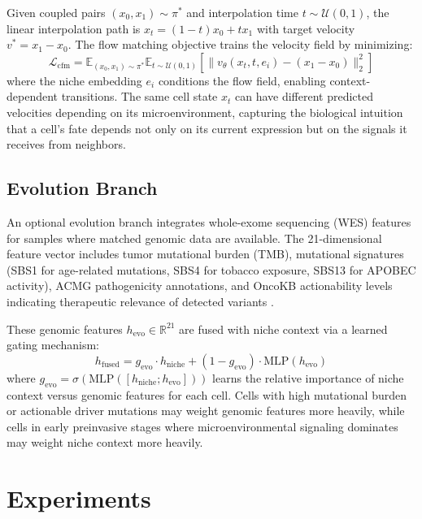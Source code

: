 \documentclass[conference]{IEEEtran}
\begin{document}
Given coupled pairs $(x_0, x_1) \sim \pi^*$ and interpolation time $t \sim \mathcal{U}(0,1)$, the linear interpolation path is $x_t = (1-t)x_0 + tx_1$ with target velocity $v^* = x_1 - x_0$. The flow matching objective trains the velocity field by minimizing:
\begin{equation}
\mathcal{L}_{\text{cfm}} = \mathbb{E}_{(x_0,x_1)\sim\pi^*} \mathbb{E}_{t \sim \mathcal{U}(0,1)} \left[\|v_\theta(x_t, t, e_i) - (x_1 - x_0)\|_2^2\right]
\label{eq:cfm}
\end{equation}
where the niche embedding $e_i$ conditions the flow field, enabling context-dependent transitions. The same cell state $x_t$ can have different predicted velocities depending on its microenvironment, capturing the biological intuition that a cell's fate depends not only on its current expression but on the signals it receives from neighbors.

\subsection{Evolution Branch}

An optional evolution branch integrates whole-exome sequencing (WES) features for samples where matched genomic data are available. The 21-dimensional feature vector includes tumor mutational burden (TMB), mutational signatures (SBS1 for age-related mutations, SBS4 for tobacco exposure, SBS13 for APOBEC activity), ACMG pathogenicity annotations, and OncoKB actionability levels indicating therapeutic relevance of detected variants \cite{Haga2023-xc}.

These genomic features $h_{\text{evo}} \in \mathbb{R}^{21}$ are fused with niche context via a learned gating mechanism:
\begin{equation}
h_{\text{fused}} = g_{\text{evo}} \cdot h_{\text{niche}} + (1 - g_{\text{evo}}) \cdot \text{MLP}(h_{\text{evo}})
\label{eq:evo}
\end{equation}
where $g_{\text{evo}} = \sigma(\text{MLP}([h_{\text{niche}}; h_{\text{evo}}]))$ learns the relative importance of niche context versus genomic features for each cell. Cells with high mutational burden or actionable driver mutations may weight genomic features more heavily, while cells in early preinvasive stages where microenvironmental signaling dominates may weight niche context more heavily.

\section{Experiments}
\end{document}
